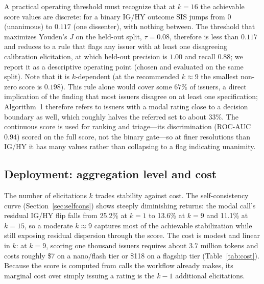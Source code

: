 \documentclass[a4paper,fleqn]{cas-sc}
\begin{document}
A practical operating threshold must recognize that at $k=16$ the achievable score values are discrete:
for a binary IG/HY outcome $\mathrm{SIS}$ jumps from $0$ (unanimous) to $0.117$ (one dissenter), with
nothing between. The threshold that maximizes Youden’s $J$ on the held-out split, $\tau=0.08$, therefore
is less than $0.117$ and reduces to a rule that flags any issuer with at least one disagreeing calibration
elicitation, at which held-out precision is $1.00$ and recall $0.88$; we report it as a descriptive
operating point (chosen and evaluated on the same split). Note that it is $k$-dependent (at the recommended
$k\approx9$ the smallest non-zero score is $0.198$). This rule alone would cover some $67\%$ of issuers,
a direct implication of the finding that most issuers disagree on at least one specification; Algorithm~1
therefore refers to issuers with a modal rating close to a decision boundary as well, which roughly halves
the referred set to about $33\%$. The continuous score is used for ranking and triage---its discrimination
(ROC-AUC $0.94$) scored on the full score, not the binary gate---so at finer resolutions than IG/HY it
has many values rather than collapsing to a flag indicating unanimity.

\subsection{Deployment: aggregation level and cost}\label{sec:sis-cost}
The number of elicitations $k$ trades stability against cost. The self-consistency curve
(Section~\ref{sec:selfcons}) shows steeply diminishing returns: the modal call's residual IG/HY flip
falls from 25.2\% at $k=1$ to 13.6\% at $k=9$ and 11.1\% at $k=15$, so a moderate $k\!\approx\!9$ captures
most of the achievable stabilization while still exposing residual dispersion through the score. The cost
is modest and linear in $k$: at $k=9$, scoring one thousand issuers requires about $3.7$ million tokens
and costs roughly \$7 on a nano/flash tier or \$118 on a flagship tier (Table~\ref{tab:cost}). Because the
score is computed from calls the workflow already makes, its marginal cost over simply issuing a rating is
the $k-1$ additional elicitations.
\end{document}
